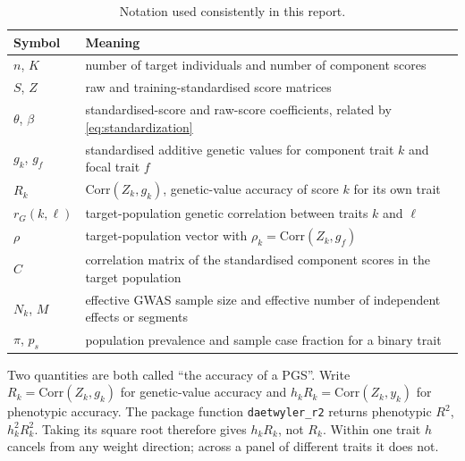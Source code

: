 \documentclass[11pt,a4paper]{article}
\newcommand{\Corr}{\mathrm{Corr}}
\newcommand{\Rtwo}{\(R^2\)}
\begin{document}
\begin{table}[ht]
\centering
\caption{Notation used consistently in this report.}
\label{tab:notation}
\small
\begin{tabularx}{\linewidth}{@{}L{22mm}Y@{}}
\toprule
\textbf{Symbol} & \textbf{Meaning} \\
\midrule
\(n\), \(K\) & number of target individuals and number of
component scores \\
\(S\), \(Z\) & raw and training-standardised score matrices \\
\(\theta\), \(\beta\) & standardised-score and raw-score
coefficients, related by \eqref{eq:standardization} \\
\(g_k\), \(g_f\) & standardised additive genetic values for
component trait \(k\) and focal trait \(f\) \\
\(R_k\) & \(\Corr(Z_k,g_k)\), genetic-value accuracy of score
\(k\) for its own trait \\
\(r_G(k,\ell)\) & target-population genetic correlation between
traits \(k\) and \(\ell\) \\
\(\rho\) & target-population vector with
\(\rho_k=\Corr(Z_k,g_f)\) \\
\(C\) & correlation matrix of the standardised component scores
in the target population \\
\(N_k\), \(M\) & effective GWAS sample size and effective number
of independent effects or segments \\
\(\pi\), \(p_s\) & population prevalence and sample case fraction
for a binary trait \\
\bottomrule
\end{tabularx}
\end{table}

Two quantities are both called ``the accuracy of a PGS''. Write
\(R_k=\Corr(Z_k,g_k)\) for genetic-value accuracy and
\(h_kR_k=\Corr(Z_k,y_k)\) for phenotypic accuracy. The package
function \texttt{daetwyler\allowbreak\_r2} returns phenotypic \Rtwo{},
\(h_k^2R_k^2\). Taking its square root therefore gives
\(h_kR_k\), not \(R_k\). Within one trait \(h\) cancels from any
weight direction; across a panel of different traits it does not.
\end{document}
